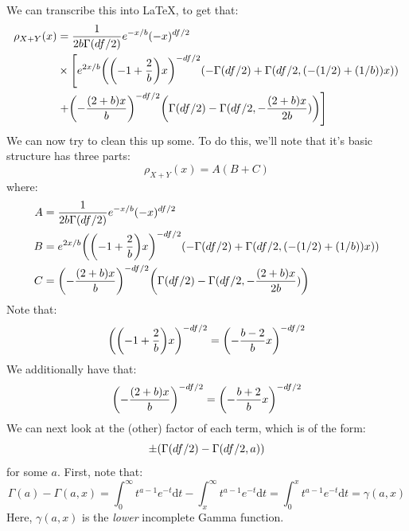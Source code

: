 \documentclass{article}
\begin{document}
We can transcribe this into \LaTeX, to get that:
\begin{align*}
\rho_{X+Y}(x) &= \frac{1}{2b\Gamma(df/2)}e^{-x/b}(-x)^{df/2} \\
&\times \left[e^{2x/b}\pqty{\pqty{-1 + \frac{2}{b}}x}^{-df/2}\pqty{-\Gamma(df/2) + \Gamma(df/2, (-(1/2) + (1/b))x)}\right. \\
&\left.+ \pqty{- \frac{(2+b)x}{b}}^{-df/2}\pqty{\Gamma(df/2)-\Gamma(df/2,-\frac{(2+b)x}{2b})}\right]
\end{align*}
We can now try to clean this up some.
To do this, we'll note that it's basic structure has three parts:
\begin{equation}
\rho_{X+Y}(x) = A(B+C)
\end{equation}
where:
\begin{align*}
A & = \frac{1}{2b\Gamma(df/2)}e^{-x/b}(-x)^{df/2} \\
B & = e^{2x/b}\pqty{\pqty{-1 + \frac{2}{b}}x}^{-df/2}\pqty{-\Gamma(df/2) + \Gamma(df/2, (-(1/2) + (1/b))x)} \\
C &= \pqty{- \frac{(2+b)x}{b}}^{-df/2}\pqty{\Gamma(df/2)-\Gamma(df/2,-\frac{(2+b)x}{2b})}
\end{align*}
Note that:
\begin{equation}
\pqty{\pqty{-1 + \frac{2}{b}}x}^{-df/2} = \pqty{-\frac{b-2}{b}x}^{-df/2}
\end{equation}
We additionally have that:
\begin{equation}
\pqty{-\frac{(2+b)x}{b}}^{-df/2} = \pqty{-\frac{b+2}{b}x}^{-df/2}
\end{equation}
We can next look at the (other) factor of each term, which is of the form:
\begin{equation}
\pm\pqty{\Gamma(df/2) - \Gamma(df/2, a)}
\end{equation}
for some $a$.
First, note that:
\begin{equation}
\Gamma(a) - \Gamma(a,x) = \int_0^\infty t^{a-1}e^{-t}\mathrm{ d}t - \int_x^\infty t^{a-1}e^{-t}\mathrm{ d}t = \int_0^x t^{a-1}e^{-t}\mathrm{ d}t = \gamma(a,x)
\end{equation}
Here, $\gamma(a,x)$ is the \emph{lower} incomplete Gamma function.
\end{document}

